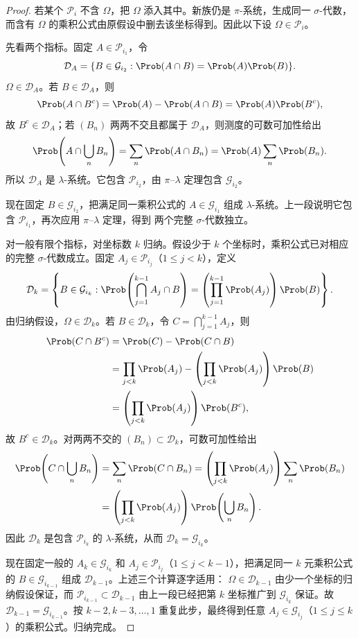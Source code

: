 \begin{proof}
若某个 $\mathcal P_i$ 不含 $\Omega$，把 $\Omega$ 添入其中。新族仍是 $\pi$-系统，生成同一
$\sigma$-代数，而含有 $\Omega$ 的乘积公式由原假设中删去该坐标得到。因此以下设
$\Omega\in\mathcal P_i$。

先看两个指标。固定 $A\in\mathcal P_{i_1}$，令
\[
 \mathcal D_A=
 \{B\in\mathcal G_{i_2}:\Prob(A\cap B)=\Prob(A)\Prob(B)\}.
\]
$\Omega\in\mathcal D_A$。若 $B\in\mathcal D_A$，则
\[
 \Prob(A\cap B^c)
 =\Prob(A)-\Prob(A\cap B)
 =\Prob(A)\Prob(B^c),
\]
故 $B^c\in\mathcal D_A$；若 $(B_n)$ 两两不交且都属于 $\mathcal D_A$，则测度的可数可加性给出
\[
 \Prob\!\left(A\cap\bigcup_nB_n\right)
 =\sum_n\Prob(A\cap B_n)
 =\Prob(A)\sum_n\Prob(B_n).
\]
所以 $\mathcal D_A$ 是 $\lambda$-系统。它包含 $\mathcal P_{i_2}$，由
$\pi$--$\lambda$ 定理包含 $\mathcal G_{i_2}$。

现在固定 $B\in\mathcal G_{i_2}$，把满足同一乘积公式的 $A\in\mathcal G_{i_1}$ 组成
$\lambda$-系统。上一段说明它包含 $\mathcal P_{i_1}$，再次应用 $\pi$--$\lambda$ 定理，得到
两个完整 $\sigma$-代数独立。

对一般有限个指标，对坐标数 $k$ 归纳。假设少于 $k$ 个坐标时，乘积公式已对相应的完整
$\sigma$-代数成立。固定 $A_j\in\mathcal P_{i_j}$（$1\le j<k$），定义
\[
 \mathcal D_k=\left\{B\in\mathcal G_{i_k}:
 \Prob\!\left(\bigcap_{j=1}^{k-1}A_j\cap B\right)
 =\left(\prod_{j=1}^{k-1}\Prob(A_j)\right)\Prob(B)\right\}.
\]
由归纳假设，$\Omega\in\mathcal D_k$。若 $B\in\mathcal D_k$，令
$C=\bigcap_{j=1}^{k-1}A_j$，则
\begin{align*}
 \Prob(C\cap B^c)
 &=\Prob(C)-\Prob(C\cap B)\\
 &=\prod_{j<k}\Prob(A_j)
   -\left(\prod_{j<k}\Prob(A_j)\right)\Prob(B)\\
 &=\left(\prod_{j<k}\Prob(A_j)\right)\Prob(B^c),
\end{align*}
故 $B^c\in\mathcal D_k$。对两两不交的 $(B_n)\subset\mathcal D_k$，可数可加性给出
\begin{align*}
 \Prob\!\left(C\cap\bigcup_nB_n\right)
 &=\sum_n\Prob(C\cap B_n)
 =\left(\prod_{j<k}\Prob(A_j)\right)\sum_n\Prob(B_n)\\
 &=\left(\prod_{j<k}\Prob(A_j)\right)\Prob\!\left(\bigcup_nB_n\right).
\end{align*}
因此 $\mathcal D_k$ 是包含 $\mathcal P_{i_k}$ 的 $\lambda$-系统，从而
$\mathcal D_k=\mathcal G_{i_k}$。

现在固定一般的 $A_k\in\mathcal G_{i_k}$ 和
$A_j\in\mathcal P_{i_j}$（$1\le j<k-1$），把满足同一 $k$ 元乘积公式的
$B\in\mathcal G_{i_{k-1}}$ 组成 $\mathcal D_{k-1}$。上述三个计算逐字适用：
$\Omega\in\mathcal D_{k-1}$ 由少一个坐标的归纳假设保证，而
$\mathcal P_{i_{k-1}}\subset\mathcal D_{k-1}$ 由上一段已经把第 $k$ 坐标推广到
$\mathcal G_{i_k}$ 保证。故 $\mathcal D_{k-1}=\mathcal G_{i_{k-1}}$。按
$k-2,k-3,\ldots,1$ 重复此步，最终得到任意
$A_j\in\mathcal G_{i_j}$（$1\le j\le k$）的乘积公式。归纳完成。
\end{proof}

